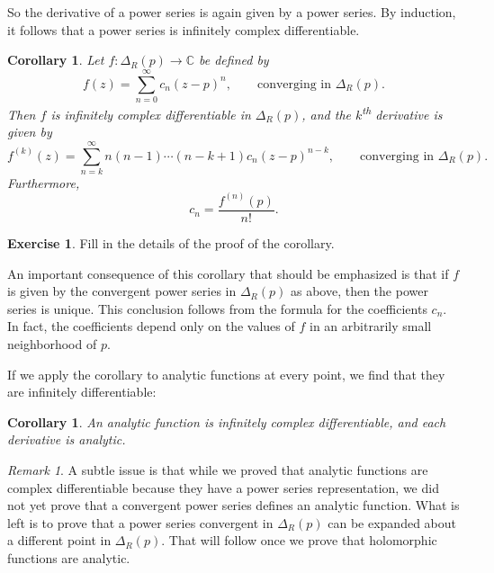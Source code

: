\documentclass[12pt,openany]{book}
\newcommand{\C}{{\mathbb{C}}}
\theoremstyle{plain}
\newtheorem{cor}[thm]{Corollary}
\theoremstyle{remark}
\newtheorem{remark}[thm]{Remark}
\theoremstyle{definition}
\newenvironment{exbox}{%
    \def\FrameCommand{\vrule width 1pt \relax\hspace{10pt}}%
    \MakeFramed{\advance\hsize-\width\FrameRestore}%
}{%
    \endMakeFramed
}
\theoremstyle{exercise}
\newtheorem{exercise}{Exercise}[section]
\theoremstyle{example}
\begin{document}
So the derivative of a power series is again given by a power series.
By induction, it follows that a power series is infinitely complex
differentiable.

\begin{cor} \label{cor:convpowserinfdif}
\pagebreak[2]
Let $f \colon \Delta_R(p) \to \C$ be defined by
\begin{equation*}
f(z) = \sum_{n=0}^\infty c_n {(z-p)}^n ,
\qquad \text{converging in } \Delta_R(p) .
\end{equation*}
Then $f$ is infinitely complex differentiable in $\Delta_R(p)$,
and the $k$\textsuperscript{th} derivative is given by
\begin{equation*}
f^{(k)}(z) = \sum_{n=k}^\infty n(n-1)\cdots(n-k+1) c_n {(z-p)}^{n-k} ,
\qquad \text{converging in } \Delta_R(p) .
\end{equation*}
Furthermore,
\begin{equation*}
c_n =
\frac{f^{(n)}(p)}{n!} .
\end{equation*}
\end{cor}

\begin{exbox}
\begin{exercise}
Fill in the details of the proof of the corollary.
\end{exercise}
\end{exbox}

An important consequence of this corollary that should be
emphasized is that if $f$ is given by the convergent power series in
$\Delta_R(p)$ as above, then the power series is unique.  This conclusion
follows from the formula for the coefficients $c_n$.  In fact, the
coefficients depend only on the values of $f$ in an arbitrarily small
neighborhood of $p$.

If we apply the corollary to analytic functions at every point,
we find that they are infinitely differentiable:

\begin{cor} \label{cor:analinfdif}
An analytic function is infinitely complex differentiable, and each
derivative is analytic.
\end{cor}

\begin{remark}
A subtle issue is that while we proved that analytic functions are
complex differentiable because they have a power series representation,
we did not yet prove that a convergent power series defines an analytic
function.  What is left is to prove that a power series convergent
in $\Delta_R(p)$ can be
expanded about a different point in $\Delta_R(p)$.  That will follow
once we prove that holomorphic functions are analytic.
\end{remark}
\end{document}
